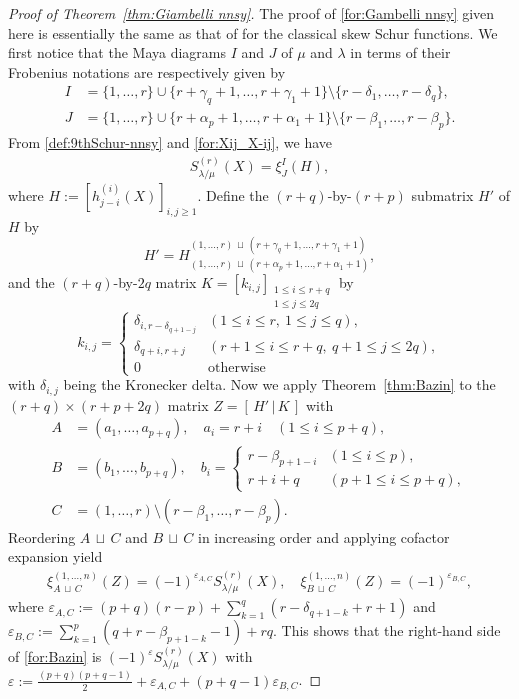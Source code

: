 \documentclass[12pt]{amsart}%
\theoremstyle{definition}
\begin{document}
\begin{proof}
[Proof of Theorem~\ref{thm:Giambelli nnsy}]
The proof of \eqref{for:Gambelli nnsy} given here is essentially the same as that of \cite{lp84}
for the classical skew Schur functions. 
We first notice that the Maya diagrams $I$ and $J$ of $\mu$ and $\lambda$ in terms of their Frobenius notations are respectively given by 
\begin{align*}
 I&=\{1,\ldots,r\}\cup\{r+\gamma_q+1,\ldots,r+\gamma_1+1\}
\setminus\{r-\delta_1,\ldots,r-\delta_q\},\\
 J&=\{1,\ldots,r\}\cup\{r+\alpha_p+1,\ldots,r+\alpha_1+1\}
\setminus\{r-\beta_1,\ldots,r-\beta_p\}.
\end{align*}
From \eqref{def:9thSchur-nnsy} and \eqref{for:Xij_X-ij}, 
we have 
\begin{align}
\label{for:9thJT-nnsy-h2}
 S^{(r)}_{\lambda/\mu}(X)
 =\xi^{I}_{J}(H),
\end{align}
where $H:=[h^{(i)}_{j-i}(X)]_{i,j\ge 1}$.
Define the $(r+q)$-by-$(r+p)$ submatrix $H'$ of $H$ by 
\[
H'=H^{(1,\ldots,r)\,\sqcup\,(r+\gamma_q+1,\ldots,r+\gamma_1+1)}_{(1,\ldots,r)\,\sqcup\,(r+\alpha_p+1,\ldots,r+\alpha_1+1)},
\]
and the $(r+q)$-by-$2q$ matrix 
$K=[k_{i,j}]_{\substack{1\le i\le r+q \\ 1\le j\le 2q}}$
by 
\[
 k_{i,j}=
 \begin{cases}
 \delta_{i,r-\delta_{q+1-j}}& (1\le i\le r,\ 1\le j\le q),\\
 \delta_{q+i,r+j} & (r+1\le i\le r+q,\ q+1\le j\le 2q), \\
 0 & \text{otherwise}
 \end{cases}
\]
with $\delta_{i,j}$ being the Kronecker delta.
Now we apply Theorem~\ref{thm:Bazin} to the $(r+q)\times (r+p+2q)$ matrix $Z=[\,H'\,|\,K\,]$ with
\begin{align*}
A&=(a_1,\ldots,a_{p+q}), \quad 
a_{i}
=r+i \quad (1\le i\le p+q),\\
B
&=(b_1,\ldots,b_{p+q}), \quad 
b_{i}
=\begin{cases}
 r-\beta_{p+1-i} & (1\le i\le p),\\
 r+i+q & (p+1\le i\le p+q),
\end{cases}
\\
C&=(1,\ldots,r)\setminus (r-\beta_1,\ldots,r-\beta_p).
\end{align*}
Reordering $A\,\sqcup\,C$ and $B\,\sqcup\,C$ in increasing order and applying cofactor expansion yield
\begin{align*}
 \xi^{(1,\ldots,n)}_{A\,\sqcup\,C}(Z)
=(-1)^{\varepsilon_{A,C}}S^{(r)}_{\lambda/\mu}(X),
\quad 
\xi^{(1,\ldots,n)}_{B\,\sqcup\,C}(Z)
=(-1)^{\varepsilon_{B,C}},
\end{align*}
where 
$\varepsilon_{A,C}:=(p+q)(r-p)+\sum^q_{k=1}(r-\delta_{q+1-k}+r+1)$
and 
$\varepsilon_{B,C}:=\sum^{p}_{k=1}(q+r-\beta_{p+1-k}-1)+rq$.
This shows that the right-hand side of \eqref{for:Bazin} is 
$(-1)^{\varepsilon}S^{(r)}_{\lambda/\mu}(X)$
with 
$\varepsilon
:={\frac{(p+q)(p+q-1)}{2}}+\varepsilon_{A,C} +(p+q-1)\varepsilon_{B,C}$.


\end{proof}
\end{document}
